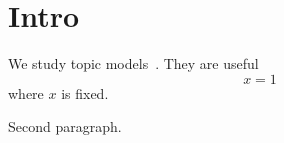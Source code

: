 \section{Intro}
We study topic models~\citep{blei}. They are useful
\begin{equation}
  x = 1
\end{equation}
where $x$ is fixed.

Second paragraph.

